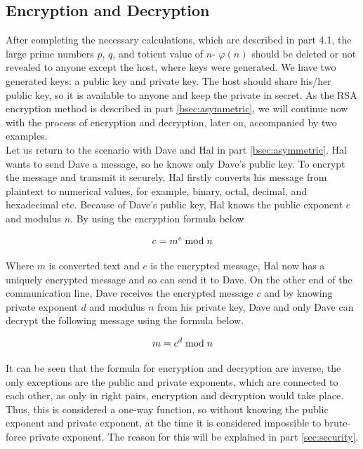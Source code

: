 \documentclass[a4paper, 12pt]{article}
\begin{document}
\subsection{Encryption and Decryption}
\label{bsec:ed}

After completing the necessary calculations, which are described in part 4.1, the large prime
numbers $p$, $q$, and totient value of $n$- $\varphi(n)$ should be deleted or not revealed to anyone except the
host, where keys were generated. We have two generated keys: a public key and private key. The
host should share his/her public key, so it is available to anyone and keep the private in secret. As
the RSA encryption method is described in part \ref{bsec:asymmetric}, we will continue now with the process of
encryption and decryption, later on, accompanied by two examples.\\

Let us return to the scenario with Dave and Hal in part \ref{bsec:asymmetric}. Hal wants to send Dave a message, so
he knows only Dave's public key. To encrypt the message and transmit it securely, Hal firstly
converts his message from plaintext to numerical values, for example, binary, octal, decimal, and
hexadecimal etc. Because of Dave's public key, Hal knows the public exponent $e$ and modulus $n$.
By using the encryption formula below

\begin{equation*}
  c = m^e \bmod n\\
  \end{equation*}

Where $m$ is converted text and $c$ is the encrypted message, Hal now has a uniquely encrypted
message and so can send it to Dave. On the other end of the communication line, Dave receives
the encrypted message $c$ and by knowing private exponent $d$ and modulus $n$ from his private key,
Dave and only Dave can decrypt the following message using the formula below.

\begin{equation*}
  m = c^d \bmod n\\
\end{equation*}

It can be seen that the formula for encryption and decryption are inverse, the only exceptions are
the public and private exponents, which are connected to each other, as only in right pairs,
encryption and decryption would take place. Thus, this is considered a one-way function, so
without knowing the public exponent and private exponent, at the time it is considered impossible
to brute-force private exponent. The reason for this will be explained in part \ref{sec:security}.\\
\end{document}
